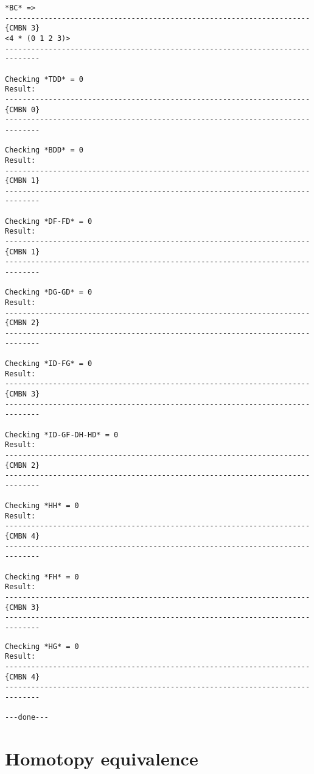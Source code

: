 \newpage
{\footnotesize\begin{verbatim}
*BC* => 
----------------------------------------------------------------------{CMBN 3}
<4 * (0 1 2 3)>
------------------------------------------------------------------------------

Checking *TDD* = 0
Result: 
----------------------------------------------------------------------{CMBN 0}
------------------------------------------------------------------------------

Checking *BDD* = 0
Result: 
----------------------------------------------------------------------{CMBN 1}
------------------------------------------------------------------------------

Checking *DF-FD* = 0
Result: 
----------------------------------------------------------------------{CMBN 1}
------------------------------------------------------------------------------

Checking *DG-GD* = 0
Result: 
----------------------------------------------------------------------{CMBN 2}
------------------------------------------------------------------------------

Checking *ID-FG* = 0
Result: 
----------------------------------------------------------------------{CMBN 3}
------------------------------------------------------------------------------

Checking *ID-GF-DH-HD* = 0
Result: 
----------------------------------------------------------------------{CMBN 2}
------------------------------------------------------------------------------

Checking *HH* = 0
Result: 
----------------------------------------------------------------------{CMBN 4}
------------------------------------------------------------------------------

Checking *FH* = 0
Result: 
----------------------------------------------------------------------{CMBN 3}
------------------------------------------------------------------------------
\end{verbatim}}
\newpage
{\footnotesize\begin{verbatim}
Checking *HG* = 0
Result: 
----------------------------------------------------------------------{CMBN 4}
------------------------------------------------------------------------------

---done---
\end{verbatim}}
\newpage

\section {Homotopy equivalence}

